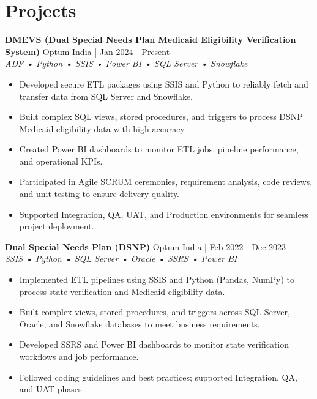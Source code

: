 \documentclass[a4paper,8pt]{article}
\begin{document}
\section{Projects}
\vspace{0.2cm}

\noindent
\textbf{DMEVS (Dual Special Needs Plan Medicaid Eligibility Verification System)} 
\hfill 
\textcolor[HTML]{371e77}{Optum India | Jan 2024 - Present} \\
\textit{\textcolor[HTML]{371e77}{ ADF • Python • SSIS • Power BI • SQL Server • Snowflake}}\\[-1.7em]

\begin{itemize}[leftmargin=1.2em, itemsep=1pt, topsep=0pt, parsep=0pt, partopsep=0pt]
    \item Developed secure ETL packages using SSIS and Python to reliably fetch and transfer data from SQL Server and Snowflake.
    \item Built complex SQL views, stored procedures, and triggers to process DSNP Medicaid eligibility data with high accuracy.
    \item Created Power BI dashboards to monitor ETL jobs, pipeline performance, and operational KPIs.
    \item Participated in Agile SCRUM ceremonies, requirement analysis, code reviews, and unit testing to ensure delivery quality.
    \item Supported Integration, QA, UAT, and Production environments for seamless project deployment.
\end{itemize}

\vspace{3.2cm}

\noindent
\textbf{Dual Special Needs Plan (DSNP)} 
\hfill 
\textcolor[HTML]{371e77}{Optum India | Feb 2022 - Dec 2023} \\
\textit{\textcolor[HTML]{371e77}{ SSIS • Python • SQL Server • Oracle • SSRS • Power BI}}\\[-1.7em]

\begin{itemize}[leftmargin=1.2em, itemsep=1pt, topsep=0pt, parsep=0pt, partopsep=0pt]
    \item Implemented ETL pipelines using SSIS and Python (Pandas, NumPy) to process state verification and Medicaid eligibility data.
    \item Built complex views, stored procedures, and triggers across SQL Server, Oracle, and Snowflake databases to meet business requirements.
    \item Developed SSRS and Power BI dashboards to monitor state verification workflows and job performance.
    \item Followed coding guidelines and best practices; supported Integration, QA, and UAT phases.
\end{itemize}
\end{document}
